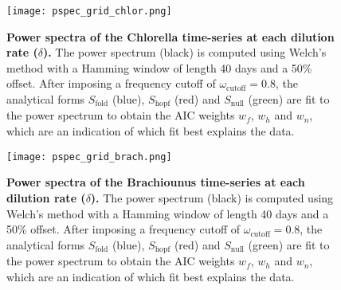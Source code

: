 \documentclass[10pt]{article}
\begin{document}
\begin{figure}[H]
\centering
\texttt{[image: pspec\_grid\_chlor.png]}
\vspace{0.4cm}
\caption{\textbf{Power spectra of the Chlorella time-series at each dilution rate ($\delta$).} The power spectrum (black) is computed using Welch's method with a Hamming window of length 40 days and a 50\% offset. After imposing a frequency cutoff of $\omega_{\text{cutoff}}=0.8$, the analytical forms $S_{\text{fold}}$ (blue), $S_{\text{hopf}}$ (red) and $S_{\text{null}}$ (green) are fit to the power spectrum to obtain the AIC weights $w_f$, $w_h$ and $w_n$, which are an indication of which fit best explains the data.}
\label{fig:fussmann_pspec_chlor}
\end{figure}



\begin{figure}[H]
\centering
\texttt{[image: pspec\_grid\_brach.png]}
\vspace{0.4cm}
\caption{\textbf{Power spectra of the Brachiounus time-series at each dilution rate ($\delta$).} The power spectrum (black) is computed using Welch's method with a Hamming window of length 40 days and a 50\% offset. After imposing a frequency cutoff of $\omega_{\text{cutoff}}=0.8$, the analytical forms $S_{\text{fold}}$ (blue), $S_{\text{hopf}}$ (red) and $S_{\text{null}}$ (green) are fit to the power spectrum to obtain the AIC weights $w_f$, $w_h$ and $w_n$, which are an indication of which fit best explains the data.}
\label{fig:fussmann_pspec_brach}
\end{figure}

\pagebreak


\pagebreak


\end{document}
